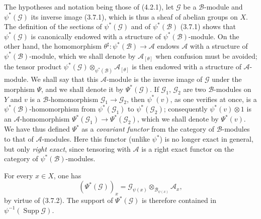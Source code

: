 \begin{env}[4.3.1]
\label{0.4.3.1}
The hypotheses and notation being those of (4.2.1), let $\mathcal{G}$ be a
$\mathcal{B}$-module and $\psi^*(\mathcal{G})$ its inverse image (3.7.1),
which is thus a sheaf of abelian groups on $X$. The definition of the
sections of $\psi^*(\mathcal{G})$ and of $\psi^*(\mathcal{B})$ (3.7.1)
shows that $\psi^*(\mathcal{G})$ is canonically endowed with a structure of
$\psi^*(\mathcal{B})$-module. On the other hand, the homomorphism
$\theta^\sharp:\psi^*(\mathcal{B})\to\mathcal{A}$ endows $\mathcal{A}$ with a
structure of $\psi^*(\mathcal{B})$-module, which we shall denote by
$\mathcal{A}_{[\theta]}$ when confusion must be avoided; the
tensor product
$\psi^*(\mathcal{G})\otimes_{\psi^*(\mathcal{B})}\mathcal{A}_{[\theta]}$
is then endowed with a structure of $\mathcal{A}$-module. We shall say that this
$\mathcal{A}$-module is the inverse image of $\mathcal{G}$ under the morphism
$\Psi$, and we shall denote it by $\Psi^*(\mathcal{G})$. If $\mathcal{G}_1$,
$\mathcal{G}_2$ are two $\mathcal{B}$-modules on $Y$ and $v$ is a
$\mathcal{B}$-homomorphism $\mathcal{G}_1\to\mathcal{G}_2$, then
$\psi^*(v)$, as one verifies at once, is a
$\psi^*(\mathcal{B})$-homomorphism from $\psi^*(\mathcal{G}_1)$ to
$\psi^*(\mathcal{G}_2)$; consequently $\psi^*(v)\otimes1$ is an
$\mathcal{A}$-homomorphism $\Psi^*(\mathcal{G}_1)\to\Psi^*(\mathcal{G}_2)$,
which we shall denote by $\Psi^*(v)$. We have thus defined $\Psi^*$ as a
\emph{covariant functor} from the category of $\mathcal{B}$-modules to that
of $\mathcal{A}$-modules. Here this functor (unlike $\psi^*$) is no
longer exact in general, but only \emph{right exact}, since tensoring
with $\mathcal{A}$ is a right exact functor on the category of
$\psi^*(\mathcal{B})$-modules.

For every $x\in X$, one has
\[
  (\Psi^*(\mathcal{G}))_x
  =\mathcal{G}_{\psi(x)}\otimes_{\mathcal{B}_{\psi(x)}}\mathcal{A}_x,
\]
by virtue of (3.7.2). The support of $\Psi^*(\mathcal{G})$ is therefore contained in
$\psi^{-1}(\operatorname{Supp}\mathcal{G})$.
\end{env}

